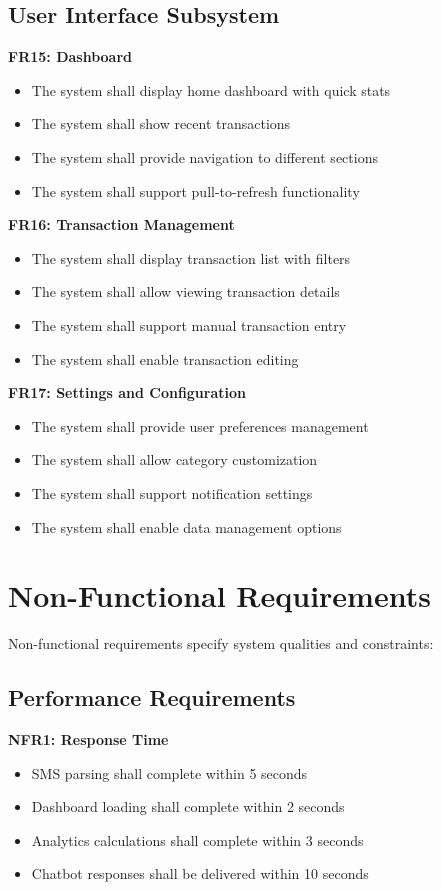 \documentclass[11pt,a4paper]{report}
\begin{document}
\subsection{User Interface Subsystem}

\textbf{FR15: Dashboard}
\begin{itemize}
    \item The system shall display home dashboard with quick stats
    \item The system shall show recent transactions
    \item The system shall provide navigation to different sections
    \item The system shall support pull-to-refresh functionality
\end{itemize}

\textbf{FR16: Transaction Management}
\begin{itemize}
    \item The system shall display transaction list with filters
    \item The system shall allow viewing transaction details
    \item The system shall support manual transaction entry
    \item The system shall enable transaction editing
\end{itemize}

\textbf{FR17: Settings and Configuration}
\begin{itemize}
    \item The system shall provide user preferences management
    \item The system shall allow category customization
    \item The system shall support notification settings
    \item The system shall enable data management options
\end{itemize}

\section{Non-Functional Requirements}

Non-functional requirements specify system qualities and constraints:

\subsection{Performance Requirements}

\textbf{NFR1: Response Time}
\begin{itemize}
    \item SMS parsing shall complete within 5 seconds
    \item Dashboard loading shall complete within 2 seconds
    \item Analytics calculations shall complete within 3 seconds
    \item Chatbot responses shall be delivered within 10 seconds
\end{itemize}
\end{document}
